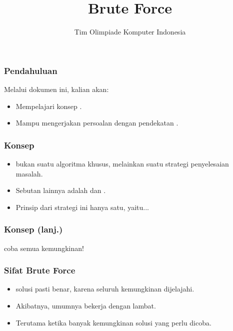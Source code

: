 

\title{Brute Force}
\author{Tim Olimpiade Komputer Indonesia}
\date{}



\begin{frame}
\titlepage
\end{frame}

\begin{frame}
\frametitle{Pendahuluan}
Melalui dokumen ini, kalian akan:
\begin{itemize}
  \item Mempelajari konsep \fbruteForce.
  \item Mampu mengerjakan persoalan dengan pendekatan \fbruteForce.
\end{itemize}
\end{frame}

\begin{frame}
\frametitle{Konsep}
\begin{itemize}
  \item \fBruteForce bukan suatu algoritma khusus, melainkan suatu strategi penyelesaian masalah.
  \item Sebutan lainnya adalah \fCompleteSearch dan \fExhaustiveSearch.
  \item Prinsip dari strategi ini hanya satu, yaitu...
\end{itemize}
\end{frame}

\begin{frame}
\frametitle{Konsep (lanj.)}
\begin{center}
  \huge coba semua kemungkinan!
\end{center}
\end{frame}

\begin{frame}
\frametitle{Sifat Brute Force}
\begin{itemize}
  \item \fBruteForce {} solusi pasti benar, karena seluruh kemungkinan dijelajahi.
  \item Akibatnya, umumnya \fbruteForce bekerja dengan lambat.
  \item Terutama ketika banyak kemungkinan solusi yang perlu dicoba.
\end{itemize}
\end{frame}

